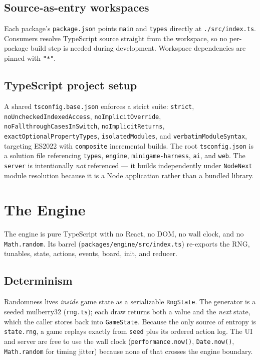 \documentclass[11pt,a4paper]{article}
\newcommand{\code}[1]{\texttt{#1}}
\begin{document}
\subsection{Source-as-entry workspaces}
Each package's \code{package.json} points \code{main} and \code{types} directly
at \code{./src/index.ts}. Consumers resolve TypeScript source straight from the
workspace, so no per-package build step is needed during development. Workspace
dependencies are pinned with \code{"*"}.

\subsection{TypeScript project setup}
A shared \code{tsconfig.base.json} enforces a strict suite: \code{strict},
\code{noUncheckedIndexedAccess}, \code{noImplicitOverride},
\code{noFallthroughCasesInSwitch}, \code{noImplicitReturns},
\code{exactOptionalPropertyTypes}, \code{isolatedModules}, and
\code{verbatimModuleSyntax}, targeting ES2022 with \code{composite} incremental
builds. The root \code{tsconfig.json} is a solution file referencing
\code{types}, \code{engine}, \code{minigame-harness}, \code{ai}, and \code{web}.
The \code{server} is intentionally \emph{not} referenced --- it builds
independently under \code{NodeNext} module resolution because it is a Node
application rather than a bundled library.

\section{The Engine}

The engine is pure TypeScript with no React, no DOM, no wall clock, and no
\code{Math.random}. Its barrel (\code{packages/engine/src/index.ts}) re-exports
the RNG, tunables, state, actions, events, board, init, and reducer.

\subsection{Determinism}
Randomness lives \emph{inside} game state as a serializable \code{RngState}. The
generator is a seeded mulberry32 (\code{rng.ts}); each draw returns both a value
and the \emph{next} state, which the caller stores back into \code{GameState}.
Because the only source of entropy is \code{state.rng}, a game replays exactly
from \code{seed} plus its ordered action log. The UI and server are free to use
the wall clock (\code{performance.now()}, \code{Date.now()}, \code{Math.random}
for timing jitter) because none of that crosses the engine boundary.
\end{document}
